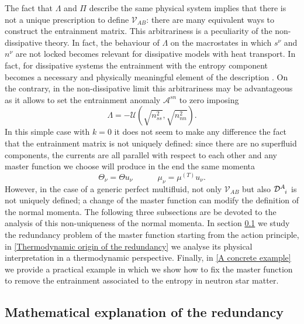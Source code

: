 \documentclass[usenatbib]{mnras}
\newcommand{\spc}{\quad \quad \quad}
\begin{document}
The fact that $\Lambda$ and $\Pi$ describe the same physical system implies that there is not a unique prescription to define $\mathcal{V}_{AB}$: there are many equivalent ways to construct the entrainment matrix.
This arbitrariness  is a peculiarity of the non-dissipative theory. In fact, the behaviour of $\Lambda$ on the macrostates in which $s^\nu$ and $n^\nu$ are not locked becomes relevant for dissipative models with heat transport. In fact, for dissipative systems the entrainment with the entropy component becomes a necessary and physically meaningful element of the description \citep[see e.g. ][]{lopez2011}. On the contrary, in the non-dissipative limit this arbitrariness may be advantageous as it allows to set the entrainment anomaly $\mathcal{A}^{sn}$ to zero imposing
%
\begin{equation}
\Lambda=-\mathcal{U}(\sqrt{n_{ss}^2}, \sqrt{n_{nn}^2}).
\end{equation}
%
In this simple case with $k=0$ it does not seem to make any difference the fact that the entrainment matrix is not uniquely defined: since there are no superfluid components, the currents are all parallel with respect to each other and any master function we choose will produce in the end the same momenta
%
\begin{equation}
\Theta_\nu = \Theta u_\nu \spc \mu_\nu = \mu^{(T)}u_\nu .
\end{equation}
%
However, in the case of a generic perfect multifluid, not only $\mathcal{V}_{AB}$ but also $\mathcal{D}\indices{^A _i}$ is not uniquely defined; a change of the master function can modify the definition of the normal momenta. 
The following three subsections are be devoted to the analysis of this non-uniqueness of the normal momenta. In section \ref{Mathematical explanation of the redundancy} we study the redundancy problem of the master function starting from the action principle, in \ref{Thermodynamic origin of the redundancy} we  analyse its physical interpretation in a thermodynamic perspective. Finally, in \ref{A concrete example} we  provide a practical example in which we show how to fix the master function to remove the entrainment associated to the entropy in neutron star matter.


\subsection{Mathematical explanation of the redundancy}
\label{Mathematical explanation of the redundancy}
\end{document}
